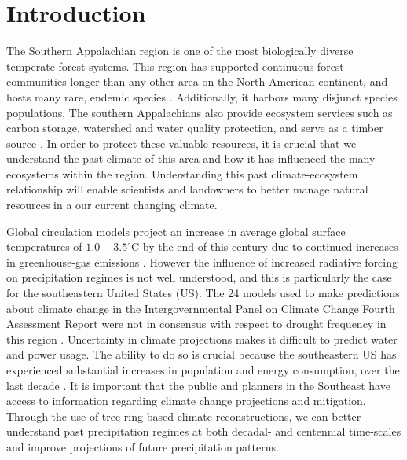 \section{Introduction}


The Southern Appalachian region is one of the most biologically diverse
temperate forest systems.  This region has supported continuous forest
communities longer than any other area on the North American continent,
and hosts many rare, endemic species \cite{NCNHP2012}. Additionally,
it harbors many disjunct species populations. The southern
Appalachians also provide ecosystem services such as carbon storage,
watershed and water quality protection, and serve as a timber source
\cite{zipper2011restoring}. In order to protect these valuable resources,
it is crucial that we understand the past climate of this
area and how it has influenced the many ecosystems within the region.
Understanding this past climate-ecosystem relationship will enable scientists and landowners
to better manage natural resources in a our current changing climate.

Global circulation models project an increase in average global surface
temperatures of $1.0-3.5^{\circ}$C by the end of this century due to
continued increases in greenhouse-gas emissions \cite{pachauri2007climate,
kattenberg1996climate}. However the influence of increased radiative
forcing on precipitation regimes is not well understood, and this is
particularly the case for the southeastern United States (US). The
24 models used to make predictions about climate change in the
Intergovernmental Panel on Climate Change Fourth Assessment Report
were not in consensus with respect to drought frequency in this region
\cite{pachauri2007climate, seager2009drought}.  Uncertainty in climate
projections makes it difficult to predict water and power usage. The
ability to do so is crucial because the southeastern US has experienced
substantial increases in population and energy consumption, over the last
decade \cite{seager2009drought, sobolowski2012evaluation}. It is important
that the public and planners in the Southeast have access to information
regarding climate change projections and mitigation. Through the use of
tree-ring based climate reconstructions, we can better understand
past precipitation regimes at both decadal- and centennial time-scales and 
improve projections of future precipitation patterns.%



